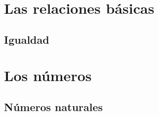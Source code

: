 \section{Las relaciones básicas}
\subsection{Igualdad}




\section{Los números}
\subsection{Números naturales}



